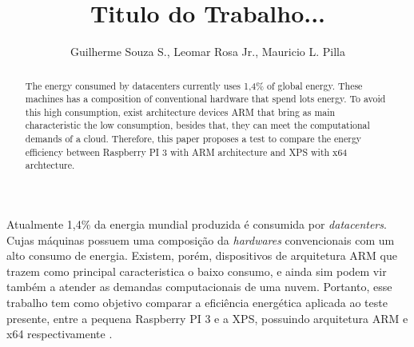\documentclass[12pt]{article}
\title{Titulo do Trabalho...}
\author{Guilherme Souza S.\inst{1}, Leomar Rosa Jr.\inst{1}, Mauricio L. Pilla\inst{1} }
\begin{document}
 
\maketitle

\begin{abstract}
  The energy consumed by datacenters currently uses 1,4\% of global energy. %
  These machines has a composition of conventional hardware that spend lots energy. 
  To avoid this high consumption, exist architecture devices ARM that bring as main characteristic the low consumption, besides that, they can meet the computational demands of a cloud. 
  Therefore, this paper proposes a test to compare the energy efficiency between Raspberry PI 3 with ARM architecture and XPS with x64 archtecture. 
\end{abstract}
     
\begin{resumo} 
  Atualmente 1,4\% da energia mundial produzida é consumida por \textit{datacenters}. Cujas máquinas possuem uma composição da \textit{hardwares} convencionais com um alto consumo de energia. Existem, porém, dispositivos de arquitetura ARM que trazem como principal caracteristica o baixo consumo, e ainda sim podem vir também a atender as demandas computacionais de uma nuvem. Portanto, esse trabalho tem como objetivo comparar a eficiência energética aplicada ao teste presente, entre a pequena Raspberry PI 3 e a XPS, possuindo arquitetura ARM e x64 respectivamente .
\end{resumo}
\end{document}
